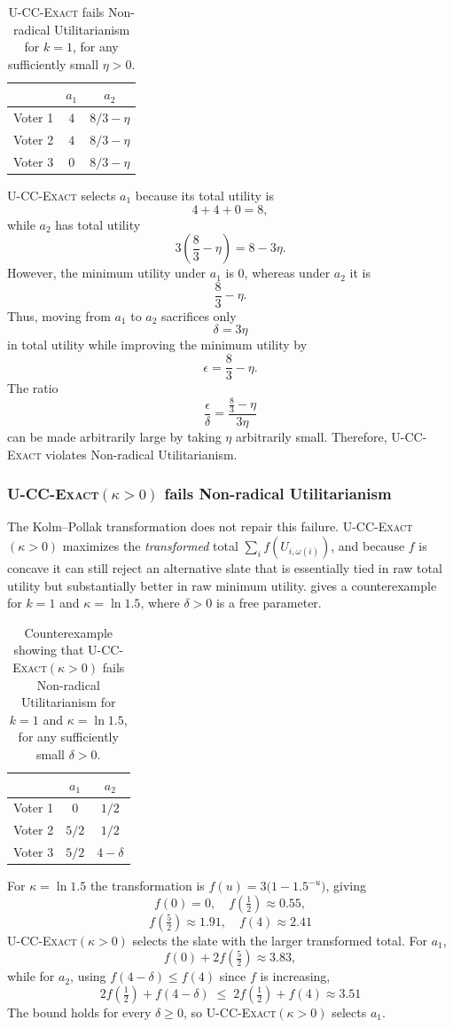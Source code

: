 \documentclass[letterpaper]{article} %
\newcommand{\Exact}{\textsc{U-CC-Exact}}
\newcommand{\ExactP}{\textsc{U-CC-Exact}$(\kappa>0)$}
\begin{document}
\begin{table}[t]
\centering
\begin{tabular}{l|cc}
\hline
 & $a_1$ & $a_2$ \\
\hline
Voter 1 & $4$ & $8/3-\eta$ \\
Voter 2 & $4$ & $8/3-\eta$ \\
Voter 3 & $0$ & $8/3-\eta$ \\
\hline
\end{tabular}
\caption{\Exact{} fails Non-radical Utilitarianism for \(k=1\), for any sufficiently small \(\eta>0\).}
\label{tab:failure-exact-nru}
\end{table}

\Exact{} selects \(a_1\) because its total utility is
\[
4+4+0=8,
\]
while \(a_2\) has total utility
\[
3\left(\frac{8}{3}-\eta\right)=8-3\eta.
\]
However, the minimum utility under \(a_1\) is \(0\), whereas under \(a_2\) it is
\[
\frac{8}{3}-\eta.
\]
Thus, moving from \(a_1\) to \(a_2\) sacrifices only
\[
\delta=3\eta
\]
in total utility while improving the minimum utility by
\[
\epsilon=\frac{8}{3}-\eta.
\]
The ratio
\[
\frac{\epsilon}{\delta}
=
\frac{\frac{8}{3}-\eta}{3\eta}
\]
can be made arbitrarily large by taking \(\eta\) arbitrarily small.
Therefore, \Exact{} violates Non-radical Utilitarianism.

\subsubsection{\ExactP{} fails Non-radical Utilitarianism}
\label{app:exactp-nru}

The Kolm--Pollak transformation does not repair this failure.
\ExactP{} maximizes the \emph{transformed} total $\sum_i f(U_{i,\omega(i)})$, and because $f$ is concave it can still reject an alternative slate that is essentially tied in raw total utility but substantially better in raw minimum utility.
 gives a counterexample for $k=1$ and $\kappa=\ln 1.5$, where $\delta>0$ is a free parameter.
\begin{table}[t]
\centering
\begin{tabular}{l|cc}
\hline
 & $a_1$ & $a_2$ \\
\hline
Voter 1 & $0$   & $1/2$ \\
Voter 2 & $5/2$ & $1/2$ \\
Voter 3 & $5/2$ & $4-\delta$ \\
\hline
\end{tabular}
\caption{Counterexample showing that \ExactP{} fails Non-radical Utilitarianism for \(k=1\) and \(\kappa=\ln 1.5\), for any sufficiently small \(\delta>0\).}
\label{tab:failure-exactp-nru}
\end{table}
For \(\kappa=\ln 1.5\) the transformation is \(f(u)=3\bigl(1-1.5^{-u}\bigr)\), giving
\[
f(0)=0,\quad f(\tfrac12)\approx0.55,
\]
\[
f(\tfrac52)\approx1.91,\quad f(4)\approx2.41
\]
\ExactP{} selects the slate with the larger transformed total.
For \(a_1\),
\[
f(0)+2f(\tfrac52)\approx3.83,
\]
while for \(a_2\), using \(f(4-\delta)\le f(4)\) since \(f\) is increasing,
\[
2f(\tfrac12)+f(4-\delta)\;\le\;2f(\tfrac12)+f(4)\approx3.51
\]
The bound holds for every \(\delta\ge 0\), so \ExactP{} selects \(a_1\).
\end{document}
